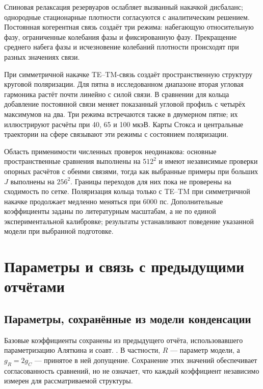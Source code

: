 \documentclass[12pt,a4paper]{article}
\begin{document}
Спиновая релаксация резервуаров ослабляет вызванный накачкой дисбаланс; однородные стационарные плотности согласуются с аналитическим решением. Постоянная когерентная связь создаёт три режима: набегающую относительную фазу, ограниченные колебания фазы и фиксированную фазу. Прекращение среднего набега фазы и исчезновение колебаний плотности происходят при разных значениях связи.

При симметричной накачке TE--TM-связь создаёт пространственную структуру круговой поляризации. Для пятна в исследованном диапазоне вторая угловая гармоника растёт почти линейно с силой связи. В сравнении для кольца добавление постоянной связи меняет показанный угловой профиль с четырёх максимумов на два. Три режима встречаются также в двумерном пятне; их иллюстрируют расчёты при 40, 65 и 100 мкэВ. Карты Стокса и центральные траектории на сфере связывают эти режимы с состоянием поляризации.

Область применимости численных проверок неодинакова: основные пространственные сравнения выполнены на \(512^2\) и имеют независимые проверки опорных расчётов с обеими связями, тогда как выбранные примеры при больших \(J\) выполнены на \(256^2\). Границы переходов для них пока не проверены на сходимость по сетке. Поляризация кольца только с TE--TM при симметричной накачке продолжает медленно меняться при 6000 пс. Дополнительные коэффициенты заданы по литературным масштабам, а не по единой экспериментальной калибровке; результаты устанавливают поведение указанной модели при выбранной подготовке.

\clearpage
\appendix
\section{Параметры и связь с предыдущими отчётами}

\subsection{Параметры, сохранённые из модели конденсации}

Базовые коэффициенты сохранены из предыдущего отчёта, использовавшего параметризацию Аляткина и соавт. \cite{ref1}. В частности, \(R\) --- параметр модели, а \(g_R=2g_C\) --- принятое в ней допущение. Сохранение этих значений обеспечивает согласованность сравнений, но не означает, что каждый коэффициент независимо измерен для рассматриваемой структуры.
\end{document}
